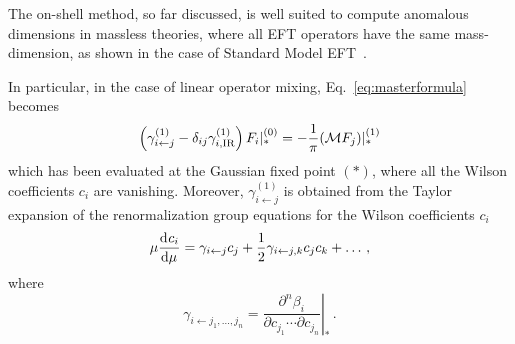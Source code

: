 The on-shell method, so far discussed, is well suited to compute anomalous dimensions in massless theories, where all 
EFT operators have the same mass-dimension, as shown in the case of Standard Model EFT~\cite{EliasMiro:2020tdv}.  

In particular, in the case of linear operator mixing, 
Eq.~\eqref{eq:masterformula}
becomes
%
\begin{equation}
\label{eq:masterformula1L}
\left(
\gamma_{i \leftarrow j}^{(1)}
-\delta_{ij}\gamma_{i,\textup{IR}}^{(1)} 
\right)
F_i|_{*}^{(0)} = -\frac{1}{\pi}(\mathcal M F_j)|_{*}^{(1)}
\end{equation}
%
which has been evaluated at the Gaussian fixed point $(*)$, where all the Wilson coefficients $c_i$ are vanishing.
Moreover, $\gamma_{i \leftarrow j}^{(1)}$ is obtained from
the Taylor expansion of the renormalization group equations for the Wilson coefficients $c_i$
%
\begin{equation}
    \mu\dv[]{c_i}{\mu} = 
    \gamma_{i\leftarrow j}c_j +
    \frac{1}{2}\gamma_{i\leftarrow j,k}c_jc_k + \dots\,,
\end{equation}
%
where 
%
\begin{equation}
    \gamma_{i\leftarrow j_1, \dotsc, j_n} = \left.\frac{\partial^n \beta_i}{\partial c_{j_1}\dotsm \partial c_{j_n}}\right |_{*}\,.
\end{equation}
%

